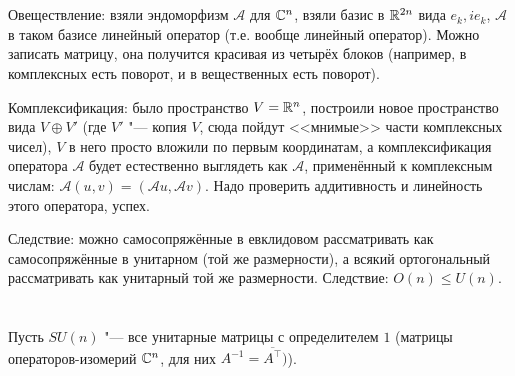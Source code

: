 \section{} %

\TODO

\section{} %

\TODO

\section{} %
Овеществление: взяли эндоморфизм $\mathcal A$ для $\mathbb{C}^n$, взяли базис в $\mathbb{R}^{2n}$ вида $e_k, ie_k$, $\mathcal A$ в таком базисе линейный оператор (т.е. вообще линейный оператор).
Можно записать матрицу, она получится красивая из четырёх блоков (например, в комплексных есть поворот, и в вещественных есть поворот).

Комплексификация: было пространство $V=\mathbb{R}^n$, построили новое пространство вида $V\oplus V'$ (где $V'$ "--- копия $V$, сюда пойдут <<мнимые>> части комплексных чисел),
$V$ в него просто вложили по первым координатам, а комплексификация оператора $\mathcal A$ будет естественно выглядеть как $\mathcal A$, применённый к комплексным
числам: $\mathcal A (u, v) = (\mathcal Au, \mathcal Av)$.
Надо проверить аддитивность и линейность этого оператора, успех.

Следствие: можно самосопряжённые в евклидовом рассматривать как самосопряжённые в унитарном (той же размерности),
а всякий ортогональный рассматривать как унитарный той же размерности.
Следствие: $O(n) \le U(n)$.

\section{} %
Пусть $SU(n)$ "--- все унитарные матрицы с определителем $1$ (матрицы операторов-изомерий $\mathbb{C}^n$, для них $A^{-1}=\overline{A^\top})$).

\TODO

\section{} %

\TODO
